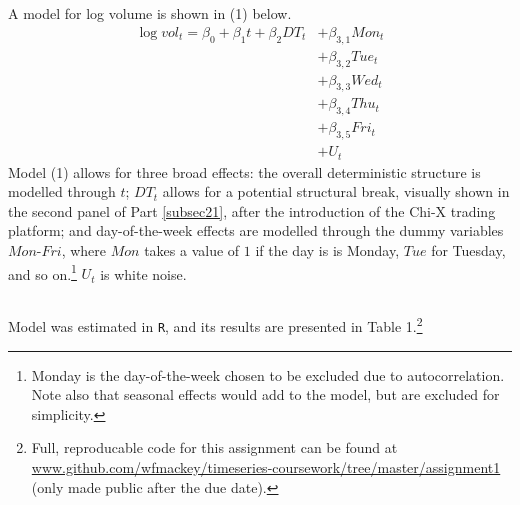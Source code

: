 \documentclass{article}
\begin{document}
\subsection{}\label{subsec22}
A model for log volume is shown in (1) below.
    \begin{align*} \label{eq22} 
    \log{vol_t}  = \beta_{0} + \beta_{1} t + \beta_{2} DT_{t} &+ \beta_{3,1} Mon_{t} \tag*{(1)} \\ 
                                                              &+ \beta_{3,2} Tue_{t} \\
                                                              &+ \beta_{3,3} Wed_{t} \\
                                                              &+ \beta_{3,4} Thu_{t} \\
                                                              &+ \beta_{3,5} Fri_{t} \\
                                                      &+ U_{t}
    \end{align*}
  Model (1) allows for three broad effects: the overall deterministic structure is modelled through $t$; $DT_{t}$ allows for a potential structural break, visually shown in the second panel of Part \ref{subsec21}, after the introduction of the Chi-X trading platform; and day-of-the-week effects are modelled through the dummy variables $Mon$-$Fri$, where $Mon$ takes a value of $1$ if the day is is Monday, $Tue$ for Tuesday, and so on.\footnote{Monday is the day-of-the-week chosen to be excluded due to autocorrelation. Note also that seasonal effects would add to the model, but are excluded for simplicity.} $U_{t}$ is white noise.




\newpage
\subsection{} \label{subsec23} %

  Model \label{eq22} was estimated in \texttt{R}, and its results are presented in Table 1.\footnote{Full, reproducable code for this assignment can be found at  \url{www.github.com/wfmackey/timeseries-coursework/tree/master/assignment1} (only made public after the due date).}
\end{document}
